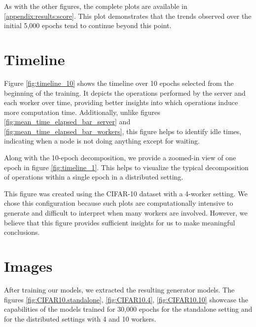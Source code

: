 As with the other figures, the complete plots are available in \ref{appendix:results:score}. This plot demonstrates that the trends observed over the initial 5,000 epochs tend to continue beyond this point.


\newpage
\section{Timeline}
Figure \ref{fig:timeline_10} shows the timeline over 10 epochs selected from the beginning of the training. It depicts the operations performed by the server and each worker over time, providing better insights into which operations induce more computation time. Additionally, unlike figures \ref{fig:mean_time_elapsed_bar_server} and \ref{fig:mean_time_elapsed_bar_workers}, this figure helps to identify idle times, indicating when a node is not doing anything except for waiting.

Along with the 10-epoch decomposition, we provide a zoomed-in view of one epoch in figure \ref{fig:timeline_1}. This helps to visualize the typical decomposition of operations within a single epoch in a distributed setting.

This figure was created using the CIFAR-10 dataset with a 4-worker setting. We chose this configuration because such plots are computationally intensive to generate and difficult to interpret when many workers are involved. However, we believe that this figure provides sufficient insights for us to make meaningful conclusions.

\newpage
\begin{multicols}{2}
\columnbreak
{}
\end{multicols}
\newpage

\section{Images}
After training our models, we extracted the resulting generator models. The figures \ref{fig:CIFAR10.standalone}, \ref{fig:CIFAR10.4}, \ref{fig:CIFAR10.10} showcase the capabilities of the models trained for 30,000 epochs for the standalone setting and for the distributed settings with 4 and 10 workers.

